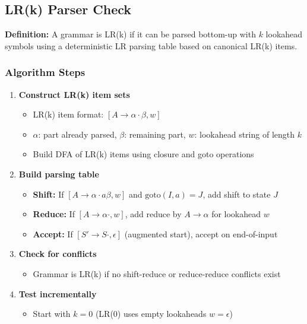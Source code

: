 \subsection{LR(k) Parser Check}

\textbf{Definition:} A grammar is LR(k) if it can be parsed bottom-up with $k$ lookahead symbols using a deterministic LR parsing table based on canonical LR(k) items.

\subsubsection{Algorithm Steps}

\begin{enumerate}
    \item \textbf{Construct LR(k) item sets}
    \begin{itemize}
        \item LR(k) item format: $[A \to \alpha \cdot \beta, w]$
        \item $\alpha$: part already parsed, $\beta$: remaining part, $w$: lookahead string of length $k$
        \item Build DFA of LR(k) items using closure and goto operations
    \end{itemize}

    \item \textbf{Build parsing table}
    \begin{itemize}
        \item \textbf{Shift:} If $[A \to \alpha \cdot a \beta, w]$ and $\text{goto}(I, a) = J$, add shift to state $J$
        \item \textbf{Reduce:} If $[A \to \alpha \cdot, w]$, add reduce by $A \to \alpha$ for lookahead $w$
        \item \textbf{Accept:} If $[S' \to S \cdot, \epsilon]$ (augmented start), accept on end-of-input
    \end{itemize}

    \item \textbf{Check for conflicts}
    \begin{itemize}
        \item Grammar is LR(k) if no shift-reduce or reduce-reduce conflicts exist
    \end{itemize}

    \item \textbf{Test incrementally}
    \begin{itemize}
        \item Start with $k = 0$ (LR(0) uses empty lookaheads $w = \epsilon$)
    \end{itemize}
\end{enumerate}


